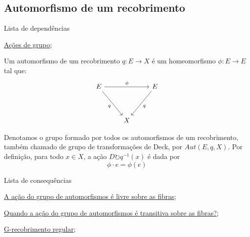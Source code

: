 \subsection{Automorfismo de um recobrimento}
\label{automorfismo-de-recobrimento-def}
\begin{titlemize}{Lista de dependências}
	\item \hyperref[ações-de-grupo-def]{Ações de grupo};
\end{titlemize}
\begin{defi}
    Um automorfismo de um recobrimento $q:E \longrightarrow X$ é um homeomorfismo $\phi:E \longrightarrow E$ tal que:
    \[\begin{tikzcd}
	E && E \\
	\\
	& X
	\arrow["\phi", from=1-1, to=1-3]
	\arrow["q"', from=1-1, to=3-2]
	\arrow["q", from=1-3, to=3-2]
    \end{tikzcd}\]
\end{defi}

Denotamos o grupo formado por todos os automorfismos de um recobrimento, também chamado de grupo de transformações de Deck, por $Aut(E, q, X)$. Por definição, para todo $x \in X$, a ação $D \circlearrowright q^{-1}(x)$ é dada por $$\phi \cdot e = \phi(e)$$

\begin{titlemize}{Lista de consequências}
	\item \hyperref[acao-de-automorfismos-e-livre-prop]{A ação do grupo de automorfismos é livre sobre as fibras};\\
    \item \hyperref[acao-de-automorfismo-transitiva-prop]{Quando a ação do grupo de automorfismos é transitiva sobre as fibras?};\\
    \item \hyperref[g-recobrimento-regular-def]{G-recobrimento regular};
\end{titlemize}
